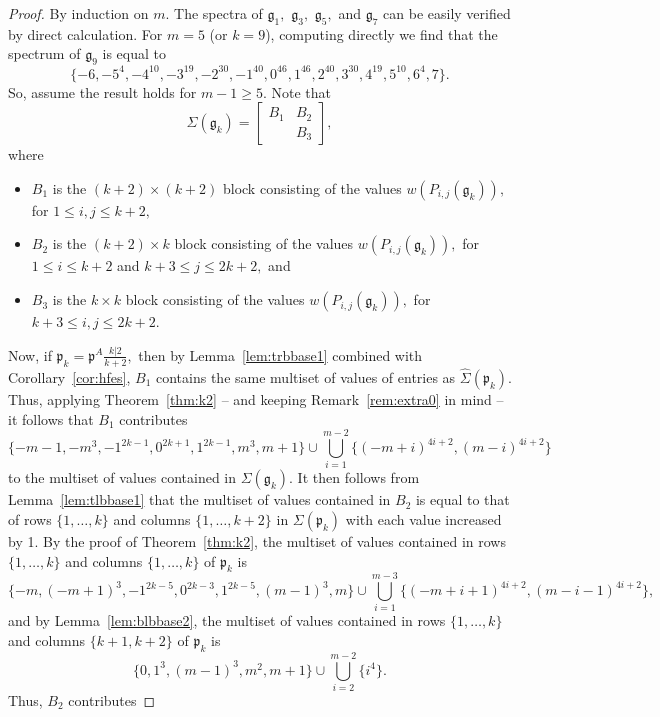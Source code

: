\documentclass[letterpaper,10pt]{article}
\begin{document}
\begin{proof}
By induction on $m.$ The spectra of $\mathfrak{g}_1,$ $\mathfrak{g}_3,$ $\mathfrak{g}_5,$ and $\mathfrak{g}_7$ can be easily verified by direct calculation. For $m=5$ (or $k=9$), computing directly we find that the spectrum of $\mathfrak{g}_9$ is equal to $$\{-6,-5^4,-4^{10},-3^{19},-2^{30},-1^{40},0^{46},1^{46},2^{40},3^{30},4^{19},5^{10},6^4,7\}.$$ So, assume the result holds for $m-1\geq 5.$ Note that $$\Sigma(\mathfrak{g}_k)=\begin{bmatrix}
B_1 & B_2\\
 & B_3
\end{bmatrix},$$ where 
\begin{itemize}
    \item $B_1$ is the $(k+2)\times(k+2)$ block consisting of the values $w(P_{i,j}(\mathfrak{g}_k)),$ for $1\leq i,j\leq k+2,$
    \item $B_2$ is the $(k+2)\times k$ block consisting of the values $w(P_{i,j}(\mathfrak{g}_k)),$ for $1\leq i\leq k+2$ and $k+3\leq j\leq 2k+2,$ and
    \item $B_3$ is the $k\times k$ block consisting of the values $w(P_{i,j}(\mathfrak{g}_k)),$ for $k+3\leq i,j\leq 2k+2.$
\end{itemize}
Now, if $\mathfrak{p}_k=\mathfrak{p}^A\frac{k|2}{k+2},$ then by Lemma~\ref{lem:trbbase1} combined with Corollary~\ref{cor:hfes}, $B_1$ contains the same multiset of values of entries as $\widehat{\Sigma}(\mathfrak{p}_k).$ Thus, applying Theorem~\ref{thm:k2} -- and keeping Remark~\ref{rem:extra0} in mind -- it follows that $B_1$ contributes
\begin{equation}\label{eqn:k+2kB1}
\{-m-1,-m^3,-1^{2k-1},0^{2k+1},1^{2k-1},m^3,m+1\}\cup\bigcup_{i=1}^{m-2}\{(-m+i)^{4i+2},(m-i)^{4i+2}\}
\end{equation} to the multiset of values contained in $\Sigma(\mathfrak{g}_k).$ It then follows from Lemma~\ref{lem:tlbbase1} that the multiset of values contained in $B_2$ is equal to that of rows $\{1,\dots,k\}$ and columns $\{1,\dots,k+2\}$ in $\Sigma(\mathfrak{p}_k)$ with each value increased by 1. By the proof of Theorem~\ref{thm:k2}, the multiset of values contained in rows $\{1,\dots,k\}$ and columns $\{1,\dots,k\}$ of $\mathfrak{p}_k$ is $$\{-m,(-m+1)^3,-1^{2k-5},0^{2k-3},1^{2k-5},(m-1)^3,m\}\cup\bigcup_{i=1}^{m-3}\{(-m+i+1)^{4i+2},(m-i-1)^{4i+2}\},$$ and by Lemma~\ref{lem:blbbase2}, the multiset of values contained in rows $\{1,\dots,k\}$ and columns $\{k+1,k+2\}$ of $\mathfrak{p}_k$ is $$\{0,1^3,(m-1)^3,m^2,m+1\}\cup\bigcup_{i=2}^{m-2}\{i^4\}.$$ Thus, $B_2$ contributes 

\end{proof}
\end{document}

